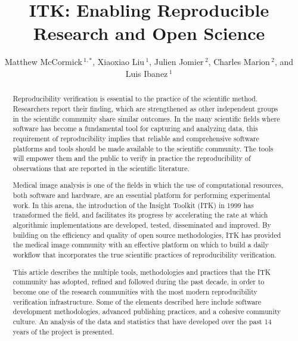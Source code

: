 \documentclass{frontiersENG} %
\def\firstAuthorLast{McCormick {et~al.}} %
\def\Authors{Matthew McCormick\,$^{1,*}$,
  Xiaoxiao Liu\,$^{1}$,
  Julien Jomier\,$^{2}$,
  Charles Marion\,$^{2}$,
  and Luis Ibanez\,$^1$}
\begin{document}
\onecolumn
{}

\title[ITK Reproducible Research]{ITK: Enabling Reproducible Research and Open Science}
\author[\firstAuthorLast ]{\Authors}
\address{}
\correspondance{}
\extraAuth{}%

\maketitle
\begin{abstract}

Reproducibility verification is essential to the practice of the scientific
method. Researchers report their finding, which are strengthened as other
independent groups in the scientific community share similar outcomes.  In the
many scientific fields where software has become a fundamental tool for
capturing and analyzing data, this requirement of reproducibility implies that
reliable and comprehensive software platforms and tools should be made
available to the scientific community. The tools will empower them and the public to
verify in practice the reproducibility of observations that are reported in
the scientific literature.

Medical image analysis is one of the fields in which the use of computational
resources, both software and hardware, are an essential platform for performing
experimental work. In this arena, the introduction of the Insight Toolkit (ITK)
in 1999 has transformed the field, and facilitates its progress by accelerating
the rate at which algorithmic implementations are developed, tested,
disseminated and improved. By building on the efficiency and quality of open
source methodologies, ITK has provided the medical image community with an
effective platform on which to build a daily workflow that incorporates the
true scientific practices of reproducibility verification.

This article describes the multiple tools, methodologies and practices that the
ITK community has adopted, refined and followed during the past decade, in
order to become one of the research communities with the most modern reproducibility
verification infrastructure. Some of the elements described here include
software development methodologies, advanced publishing practices, and a
cohesive community culture. An analysis of the data and statistics that have
developed over the past 14 years of the project is presented.

\end{abstract}
\end{document}
